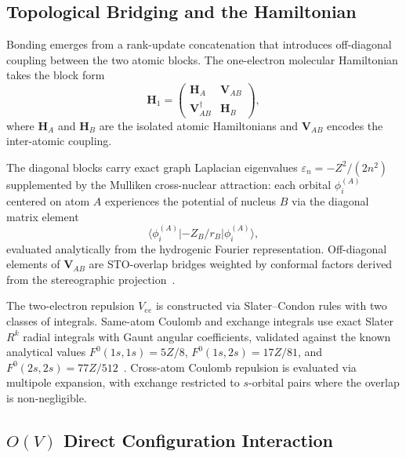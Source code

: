 \documentclass[aps,pra,twocolumn,superscriptaddress,longbibliography]{revtex4-2}
\begin{document}
\subsection{Topological Bridging and the Hamiltonian}
\label{sec:bridging}

Bonding emerges from a rank-update concatenation that introduces
off-diagonal coupling between the two atomic blocks.  The one-electron
molecular Hamiltonian takes the block form
\begin{equation}
\mathbf{H}_1 =
\begin{pmatrix}
\mathbf{H}_A & \mathbf{V}_{AB} \\
\mathbf{V}_{AB}^{\dagger} & \mathbf{H}_B
\end{pmatrix},
\label{eq:block_h1}
\end{equation}
where $\mathbf{H}_A$ and $\mathbf{H}_B$ are the isolated atomic
Hamiltonians and $\mathbf{V}_{AB}$ encodes the inter-atomic coupling.

The diagonal blocks carry exact graph Laplacian eigenvalues
$\varepsilon_n = -Z^2/(2n^2)$ supplemented by the Mulliken
cross-nuclear attraction: each orbital $\phi_i^{(A)}$ centered on atom
$A$ experiences the potential of nucleus $B$ via the diagonal matrix
element
\begin{equation}
\langle \phi_i^{(A)} | {-Z_B}/{r_B} | \phi_i^{(A)} \rangle,
\label{eq:mulliken}
\end{equation}
evaluated analytically from the hydrogenic Fourier representation.
Off-diagonal elements of $\mathbf{V}_{AB}$ are STO-overlap bridges
weighted by conformal factors derived from the stereographic
projection~\cite{fock1935}.

The two-electron repulsion $V_{ee}$ is constructed via Slater--Condon
rules with two classes of integrals.  Same-atom Coulomb and exchange
integrals use exact Slater $R^k$ radial integrals with Gaunt angular
coefficients, validated against the known analytical values
$F^0(1s,1s)=5Z/8$, $F^0(1s,2s)=17Z/81$, and
$F^0(2s,2s)=77Z/512$~\cite{shull_lowdin}.  Cross-atom Coulomb repulsion
is evaluated via multipole expansion, with exchange restricted to
$s$-orbital pairs where the overlap is non-negligible.

\subsection{\texorpdfstring{$O(V)$}{O(V)} Direct Configuration Interaction}
\label{sec:direct_ci}
\end{document}
